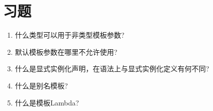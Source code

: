 \section{习题}
\begin{enumerate}
\item
什么类型可以用于非类型模板参数?

\item
默认模板参数在哪里不允许使用?

\item
什么是显式实例化声明，在语法上与显式实例化定义有何不同?

\item
什么是别名模板?

\item
什么是模板Lambda?
\end{enumerate}